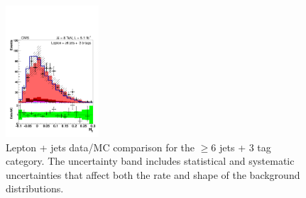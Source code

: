 \begin{figure}[hbtp]
\begin{center}
   \includegraphics[width=0.31\textwidth]{Figures/Analysis_1_Diagrams/d2MCPlots_h2_cut6_jge6_t3_Combined_HtWgt.pdf}
   \hspace{0.055\textwidth}
   \caption{Lepton + jets data/MC comparison for the $\ge$6 jets + 3 tag category.  The uncertainty band includes statistical and systematic uncertainties that affect both the rate and shape of the background distributions.}
   \label{fig:lj_input_6j_3t_part1}
 \end{center}
\end{figure}

\clearpage

